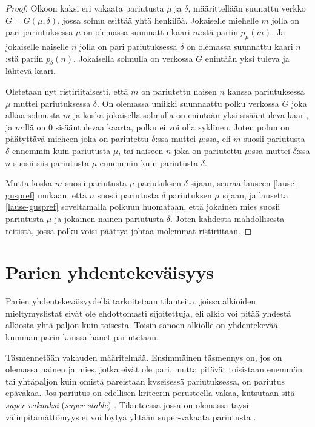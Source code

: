 \documentclass[finnish]{tktltiki2}
\theoremstyle{definition}
\theoremstyle{remark}
\begin{document}
\begin{proof}
Olkoon kaksi eri vakaata pariutusta $\mu$ ja $\delta$, määrittellään suunattu verkko $G = G(\mu, \delta)$, jossa solmu esittää yhtä henkilöä. Jokaiselle miehelle $m$ jolla on pari pariutuksessa $\mu$ on olemassa suunnattu kaari $m$:stä pariin $p_{\mu}(m)$. Ja jokaiselle naiselle $n$ jolla on pari pariutuksessa $\delta$ on olemassa suunnattu kaari $n$:stä pariin $p_{\delta}(n)$.
Jokaisella solmulla on verkossa $G$ enintään yksi tuleva ja lähtevä kaari.

Oletetaan nyt ristiriitaisesti, että $m$ on pariutettu naisen $n$ kanssa pariutuksessa $\mu$ muttei pariutuksessa $\delta$. On olemassa uniikki suunnaattu polku verkossa $G$ joka alkaa solmusta $m$ ja koska jokaisella solmulla on enintään yksi sisääntuleva kaari, ja $m$:llä on 0 sisääntulevaa kaarta, polku ei voi olla syklinen. Joten polun on päätyttävä mieheen joka on pariutettu $\delta$:ssa muttei $\mu$:ssa, eli $m$ suosii pariutusta $\delta$ ennemmin kuin pariutusta $\mu$, tai naiseen $n$ joka on pariutettu $\mu$:ssa muttei $\delta$:ssa $n$ suosii siis pariutusta $\mu$ ennemmin kuin pariutusta $\delta$.

Mutta koska $m$ suosii pariutusta $\mu$ pariutuksen $\delta$ sijaan, seuraa lauseen \ref{lause-guspref} mukaan, että $n$ suosii pariutusta $\delta$ pariutuksen $\mu$ sijaan, ja lausetta \ref{lause-guspref} soveltamalla polkuun huomataan, että jokainen mies suosii pariutusta $\mu$ ja jokainen nainen pariutusta $\delta$. Joten kahdesta mahdollisesta reitistä, jossa polku voisi päättyä johtaa molemmat ristiriitaan.
\end{proof}

\section{Parien yhdentekeväisyys}
Parien yhdentekeväisyydellä tarkoitetaan tilanteita, joissa alkioiden mieltymyslistat eivät ole ehdottomasti sijoitettuja, eli alkio voi pitää yhdestä alkiosta yhtä paljon kuin toisesta. Toisin sanoen alkiolle on yhdentekevää kumman parin kanssa hänet pariutetaan.

Täsmennetään vakauden määritelmää. Ensimmäinen täsmennys on, jos on olemassa nainen ja mies, jotka eivät ole pari, mutta pitävät toisistaan enemmän tai yhtäpaljon kuin omista pareistaan kyseisessä pariutuksessa, on pariutus epävakaa. Jos pariutus on edellisen kriteerin perusteella vakaa, kutsutaan sitä \emph{super-vakaaksi} (\emph{super-stable}) \cite{gusfield1989stable}. Tilanteessa jossa on olemassa täysi välinpitämättömyys ei voi löytyä yhtään super-vakaata pariutusta \cite{gusfield1989stable}.
\end{document}
